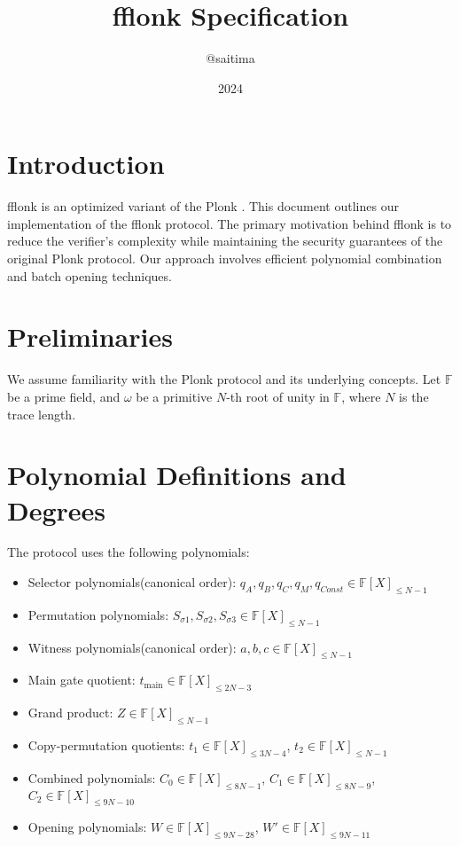 \documentclass[12pt,a4paper]{article}
\title{fflonk Specification}
\author{@saitima}
\date{2024}
\begin{document}
\maketitle

\section{Introduction}

fflonk is an optimized variant of the Plonk \cite{plonk}. This document outlines our implementation of the fflonk \cite{fflonk} protocol. The primary motivation behind fflonk is to reduce the verifier's complexity while maintaining the security guarantees of the original Plonk protocol. Our approach involves efficient polynomial combination and batch opening techniques.

\section{Preliminaries}

We assume familiarity with the Plonk protocol \cite{plonk} and its underlying concepts. Let $\mathbb{F}$ be a prime field, and $\omega$ be a primitive $N$-th root of unity in $\mathbb{F}$, where $N$ is the trace length.

\section{Polynomial Definitions and Degrees}

The protocol uses the following polynomials:

\begin{itemize}
\item Selector polynomials(canonical order): $q_A, q_B, q_C, q_M, q_{Const} \in \mathbb{F}[X]_{\leq N-1}$
\item Permutation polynomials: $S_{\sigma1}, S_{\sigma2}, S_{\sigma3} \in \mathbb{F}[X]_{\leq N-1}$
\item Witness polynomials(canonical order): $a, b, c \in \mathbb{F}[X]_{\leq N-1}$
\item Main gate quotient: $t_\text{main} \in \mathbb{F}[X]_{\leq 2N-3}$
\item Grand product: $Z \in \mathbb{F}[X]_{\leq N-1}$
\item Copy-permutation quotients: $t_1 \in \mathbb{F}[X]_{\leq 3N-4}$, $t_2 \in \mathbb{F}[X]_{\leq N-1}$
\item Combined polynomials: $C_0 \in \mathbb{F}[X]_{\leq 8N-1}$, $C_1 \in \mathbb{F}[X]_{\leq 8N-9}$, $C_2 \in \mathbb{F}[X]_{\leq 9N-10}$
\item Opening polynomials: $W \in \mathbb{F}[X]_{\leq 9N-28}$, $W' \in \mathbb{F}[X]_{\leq 9N-11}$
\end{itemize}
\end{document}
